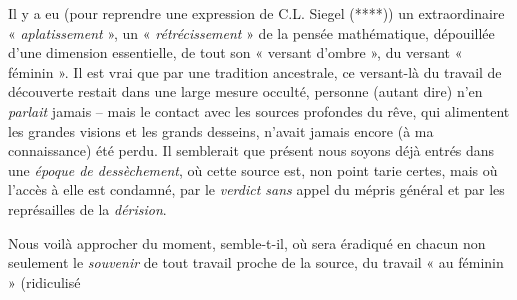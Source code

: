 \documentclass[11pt,a4paper]{article}
\begin{document}
Il y a eu (pour reprendre une expression de C.L. Siegel (****)) un extraordinaire  « \emph{aplatissement} », un « \emph{rétrécissement} » de la pensée mathématique, dépouillée d'une dimension essentielle, de tout son « versant d'ombre », du versant « féminin ». Il est vrai que par une tradition ancestrale, ce versant-là du travail de découverte restait dans une large mesure occulté, personne (autant dire) n'en \emph{parlait} jamais -- mais le contact  avec les sources profondes du rêve, qui alimentent les grandes visions et les grands desseins, n'avait jamais encore (à ma connaissance) été perdu. Il semblerait que  présent nous soyons déjà entrés dans une \emph{époque de dessèchement}, où cette source est, non point tarie certes, mais où l'accès à elle est condamné, par le \emph{verdict sans} appel du mépris général et par les représailles de la \emph{dérision}.

Nous voilà approcher du moment, semble-t-il, où sera éradiqué en chacun non seulement le \emph{souvenir} de tout travail proche de la source, du travail « au féminin » (ridiculisé
\end{document}
